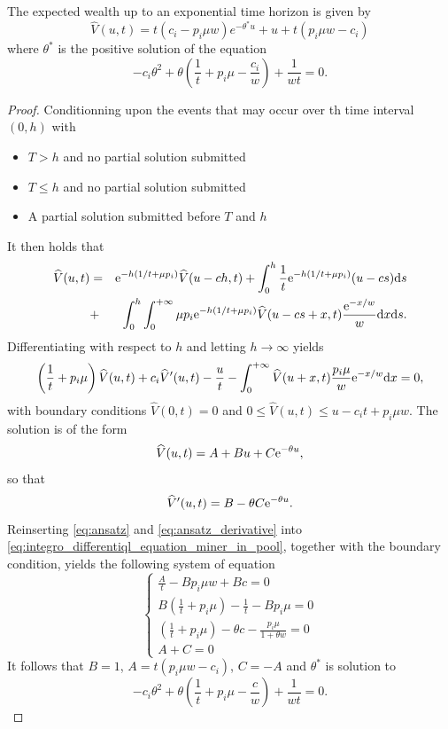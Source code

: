 \begin{prop}\label{prop:rp_hat_miner_in_pool}
The expected wealth up to an exponential time horizon is given by 
\[
\widehat{V}(u,t) = t(c_i-p_i\mu w)e^{-\theta^{\ast} u}+u +t(p_i\mu w - c_i)
\]
where $\theta^{\ast}$ is the positive solution of the equation
\[
-c_i\theta^{2}+\theta\left(\frac{1}{t}+p_i\mu-\frac{c_i}{w}\right)+\frac{1}{wt} = 0.
\]
\end{prop}
\begin{proof}
Conditionning upon the events that may occur over th time interval $(0,h)$ with 
\begin{itemize}
    \item $T>h$ and no partial solution submitted
    \item $T\leq h$ and no partial solution submitted
    \item A partial solution submitted before $T$ and $h$
\end{itemize}
It then holds that 
\begin{eqnarray*}
\widehat{V}(u,t) &=&\mathrm{e}^{-h(1/t + \mu p_i)}\widehat{V}(u-ch,t)+\int_{0}^{h}\frac{1}{t}\mathrm{e}^{-h(1/t + \mu p_i)}(u-cs)\text{d}s\\
&+& \int_{0}^{h}\int_{0}^{+\infty}\mu p_i\mathrm{e}^{-h(1/t + \mu p_i)}\widehat{V}(u-cs+x,t)\frac{\mathrm{e}^{-x/w}}{w}\text{d}x\text{d}s.
\end{eqnarray*}
Differentiating with respect to $h$ and letting $h\rightarrow\infty$ yields
\begin{equation}\label{eq:integro_differentiql_equation_miner_in_pool}
\left(\frac{1}{t}+p_i\mu\right)\widehat{V}(u,t)+c_i\widehat{V}'(u,t)-\frac{u}{t}-\int_0^{+\infty}\widehat{V}(u+x,t)\frac{p_i\mu}{w}\mathrm{e}^{-x/w}\text{d}x=0,
\end{equation}
with boundary conditions \(\widehat{V}(0,t) = 0\) and \(0\leq \widehat{V}(u,t)\leq u-c_i t +p_i\mu w\). The solution is of the form 
\begin{equation}\label{eq:ansatz}
\widehat{V}(u,t) = A+Bu+C\mathrm{e}^{-\theta u},
\end{equation}
so that 
\begin{equation}\label{eq:ansatz_derivative}
\widehat{V}'(u,t) = B-\theta C\mathrm{e}^{-\theta u}.
\end{equation}
Reinserting \eqref{eq:ansatz} and \eqref{eq:ansatz_derivative} into \eqref{eq:integro_differentiql_equation_miner_in_pool}, together with the boundary condition, yields the following system of equation
\begin{equation}
\begin{cases}
\frac{A}{t}-Bp_i\mu w+Bc =0\\
B\left(\frac{1}{t}+p_i\mu\right)-\frac{1}{t}-Bp_i\mu = 0\\
\left(\frac{1}{t}+p_i\mu\right)-\theta c -\frac{p_i\mu}{1+\theta w}=0\\
A+C = 0 
\end{cases}
\end{equation}
It follows that $B = 1$, $A = t(p_i\mu w-c_i)$, $C = -A$ and $\theta^{\ast}$ is solution to 
$$
-c_i\theta^{2}+\theta\left(\frac{1}{t}+p_i\mu-\frac{c}{w}\right)+\frac{1}{wt} = 0.
$$

\end{proof}
